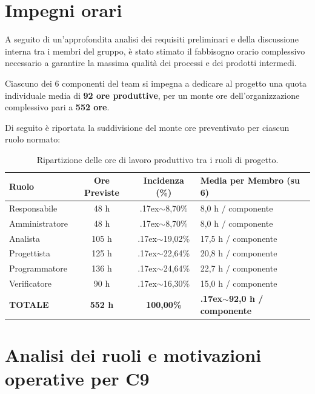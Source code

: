 \documentclass[a4paper, 11pt]{article}
\newcommand{\nmytilde}{\raise.17ex\hbox{$\scriptstyle\mathtt{\sim}$}}
\begin{document}
\section{Impegni orari}
A seguito di un'approfondita analisi dei requisiti preliminari e della discussione interna tra i membri del gruppo, è stato stimato il fabbisogno orario complessivo necessario a garantire la massima qualità dei processi e dei prodotti intermedi.

Ciascuno dei 6 componenti del team si impegna a dedicare al progetto una quota individuale media di \textbf{92 ore produttive}, per un monte ore dell'organizzazione complessivo pari a \textbf{552 ore}.

Di seguito è riportata la suddivisione del monte ore preventivato per ciascun ruolo normato:

\vspace{0.4cm}

\begin{table}[h!]
\centering
\begin{tabularx}{\textwidth}{|l|c|c|X|}
    \hline
    \textbf{Ruolo} & \textbf{Ore Previste} & \textbf{Incidenza (\%)} & \textbf{Media per Membro (su 6)} \\ \hline
    Responsabile   & 48 h  & \nmytilde8,70\%  & 8,0 h / componente \\ \hline
    Amministratore & 48 h  & \nmytilde8,70\%  & 8,0 h / componente \\ \hline
    Analista       & 105 h & \nmytilde19,02\% & 17,5 h / componente \\ \hline
    Progettista    & 125 h & \nmytilde22,64\% & 20,8 h / componente \\ \hline
    Programmatore  & 136 h & \nmytilde24,64\% & 22,7 h / componente \\ \hline
    Verificatore   & 90 h  & \nmytilde16,30\% & 15,0 h / componente \\ \hline
    \textbf{TOTALE} & \textbf{552 h} & \textbf{100,00\%} & \textbf{\nmytilde92,0 h / componente} \\ \hline
\end{tabularx}
\caption{Ripartizione delle ore di lavoro produttivo tra i ruoli di progetto.}
\end{table}

\newpage

\section{Analisi dei ruoli e motivazioni operative per C9}
\end{document}
